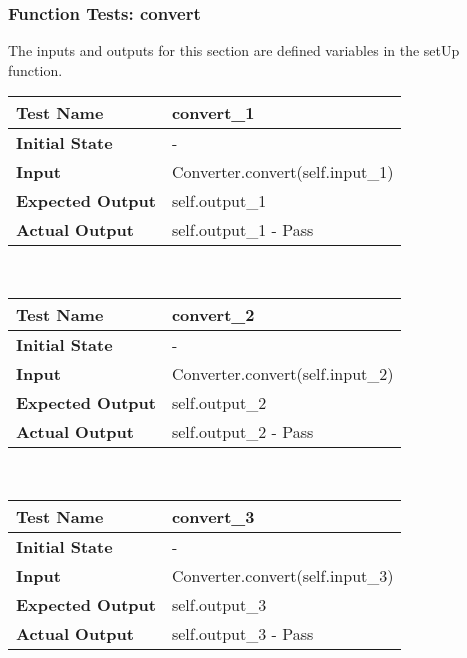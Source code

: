 \documentclass[12pt, titlepage]{article}
\begin{document}
        \FloatBarrier       %

\newpage %

	    \subsubsection{Function Tests: convert}
	    The inputs and outputs for this section are defined variables in the setUp function.
	    \begin{table}[!htbp]
			\begin{tabularx}{\textwidth}{|l|X|}%
				\hline
                \textbf{Test Name} & convert\_1  
                \\\hline
                \textbf{Initial State} & -
                \\\hline
                \textbf{Input} & Converter.convert(self.input\_1)
                \\\hline 
                \textbf{Expected Output} & self.output\_1
                \\\hline
                \textbf{Actual Output} & self.output\_1 - Pass
                \\\hline
			\end{tabularx}\\ %
	    \end{table}			
            \hfill	%
	    \begin{table}[!htbp]
			\begin{tabularx}{\textwidth}{|l|X|}%
				\hline
                \textbf{Test Name} & convert\_2  
                \\\hline
                \textbf{Initial State} & -
                \\\hline
                \textbf{Input} & Converter.convert(self.input\_2)
                \\\hline 
                \textbf{Expected Output} & self.output\_2
                \\\hline
                \textbf{Actual Output} & self.output\_2 - Pass
                \\\hline
			\end{tabularx}\\ %
	    \end{table}
            \hfill	%
	    \begin{table}[!htbp]
			\begin{tabularx}{\textwidth}{|l|X|}%
				\hline
                \textbf{Test Name} & convert\_3
                \\\hline
                \textbf{Initial State} & -
                \\\hline
                \textbf{Input} & Converter.convert(self.input\_3)
                \\\hline 
                \textbf{Expected Output} & self.output\_3
                \\\hline
                \textbf{Actual Output} & self.output\_3 - Pass
                \\\hline
			\end{tabularx}\\ %
	    \end{table}
\end{document}
